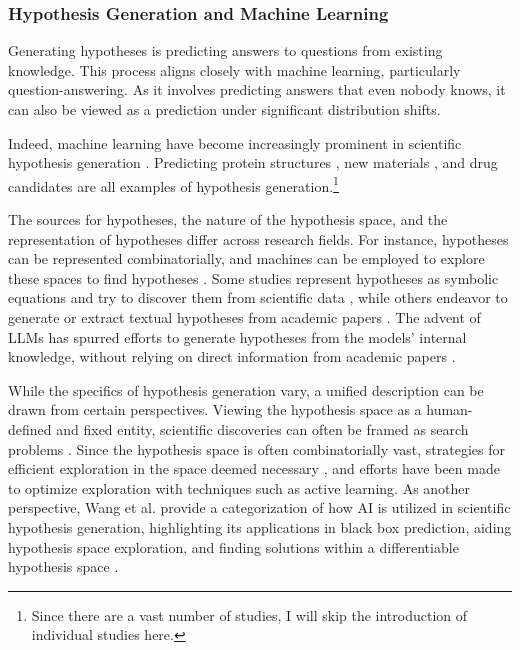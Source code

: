\subsubsection{Hypothesis Generation and Machine Learning}
Generating hypotheses is predicting answers to questions from existing knowledge. This process aligns closely with machine learning, particularly question-answering. As it involves predicting answers that even nobody knows, it can also be viewed as a prediction under significant distribution shifts.

Indeed, machine learning have become increasingly prominent in scientific hypothesis generation \cite{xu2021artificial,zhang2023artificial,wang2023scientific}. Predicting protein structures \cite{jumper2021highly}, new materials \cite{merchant2023scaling}, and drug candidates are all examples of hypothesis generation.\footnote{
Since there are a vast number of studies, I will skip the introduction of individual studies here.
}

The sources for hypotheses, the nature of the hypothesis space, and the representation of hypotheses differ across research fields. For instance, hypotheses can be represented combinatorially, and machines can be employed to explore these spaces to find hypotheses \cite{coley2020autonomous}. Some studies represent hypotheses as symbolic equations and try to discover them from scientific data \cite{kramer2023automated}, while others endeavor to generate or extract textual hypotheses from academic papers \cite{kang2022augmenting,chan2018solvent,wang2023learning,xu2023exploring,yang2023large}. The advent of LLMs has spurred efforts to generate hypotheses from the models' internal knowledge, without relying on direct information from academic papers \cite{park2023can,ai4science2023impact}.

While the specifics of hypothesis generation vary, a unified description can be drawn from certain perspectives. Viewing the hypothesis space as a human-defined and fixed entity, scientific discoveries can often be framed as search problems \cite{coley2020autonomous}. 
Since the hypothesis space is often combinatorially vast, strategies for efficient exploration in the space deemed necessary \cite{coley2020autonomousII,zenil2023future}, and efforts have been made to optimize exploration with techniques such as active learning. As another perspective, Wang et al. provide a categorization of how AI is utilized in scientific hypothesis generation, highlighting its applications in black box prediction, aiding hypothesis space exploration, and finding solutions within a differentiable hypothesis space \cite{wang2023scientific}.

